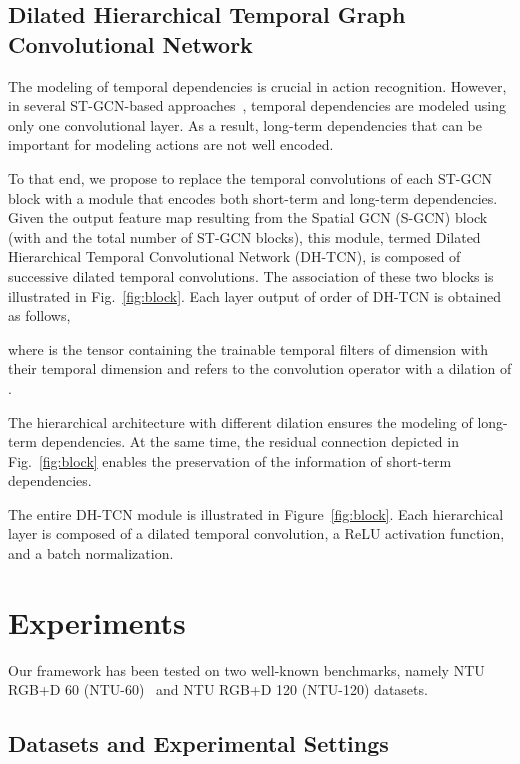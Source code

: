 \documentclass{article}
\begin{document}
\subsection{Dilated Hierarchical Temporal Graph Convolutional Network}
\label{sec:htcn}


The modeling of temporal dependencies is crucial in action recognition. However, in several ST-GCN-based approaches~\cite{yan2018spatial, shi2019two, shi2019skeleton, li2019actional}, temporal dependencies are modeled using only one convolutional layer. As a result, long-term dependencies that can be important for modeling actions are not well encoded. 

To that end, we propose to replace the temporal convolutions of each ST-GCN block with a module that encodes both short-term and long-term dependencies. Given the output feature map  resulting from the  Spatial GCN (S-GCN) block (with  and  the total number of ST-GCN blocks), this module, termed Dilated Hierarchical Temporal Convolutional Network (DH-TCN), is composed of  successive dilated temporal convolutions. The association of these two blocks is illustrated in Fig.~\ref{fig:block}. Each layer output  of order  of DH-TCN is obtained as follows,

\noindent where  is the tensor containing the trainable temporal filters of dimension  with  their temporal dimension and  refers to the convolution operator with a dilation of .

The hierarchical architecture with different dilation ensures the modeling of long-term dependencies. At the same time, the residual connection depicted in Fig.~\ref{fig:block} enables the preservation of the information of short-term dependencies. 

The entire DH-TCN module is illustrated in Figure~\ref{fig:block}. Each hierarchical layer is composed of a dilated temporal convolution, a ReLU activation function, and a batch normalization.


\section{Experiments}
\label{sec:experiments}

Our framework has been tested on two well-known benchmarks, namely NTU RGB+D 60 (NTU-60)~\cite{Shahroudy_2016_NTURGBD} and NTU RGB+D 120 (NTU-120) \cite{Liu_2019_NTURGBD120} datasets. 

\subsection{Datasets and Experimental Settings}
\label{sec:datasets}
\end{document}
